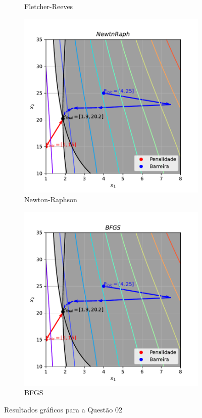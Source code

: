 \documentclass[10pt, a4paper]{article}
\begin{document}
\begin{figure}[htpb]
\begin{subfigure}[b]{0.32\textwidth}
    \caption{Fletcher-Reeves}
    \label{fig:q2_fletchrvs}
  \end{subfigure}
  \hfill
  \begin{subfigure}[b]{0.32\textwidth}
    \centering
    \includegraphics[width=\textwidth]{images/q2_NewtnRaph.pdf}
    \caption{Newton-Raphson}
    \label{fig:q2_newtnraph}
  \end{subfigure}
  \hfill
  \begin{subfigure}[b]{0.32\textwidth}
    \centering
    \includegraphics[width=\textwidth]{images/q2_BFGS.pdf}
    \caption{BFGS}
    \label{fig:q2_bfgs}
  \end{subfigure}
     \caption{Resultados gráficos para a Questão 02}
     \label{fig:q2}
\end{figure}
\end{document}
